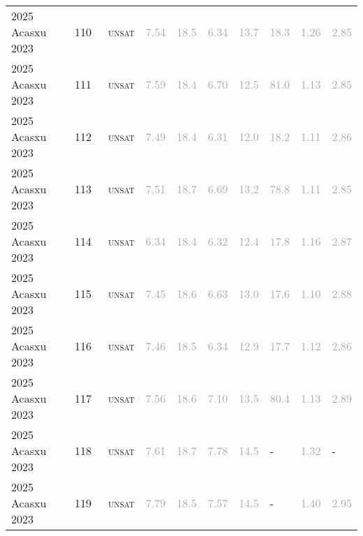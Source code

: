 \begin{center}
{\begin{longtable}{@{}llllllllll@{}}
2025 Acasxu 2023 & 110 & ~\textsc{unsat} & \textcolor{darkgray}{7.54} & \textcolor{darkgray}{18.5} & \textcolor{darkgray}{6.34} & \textcolor{darkgray}{13.7} & \textcolor{darkgray}{18.3} & \textcolor{darkgray}{1.26} & \textcolor{darkgray}{2.85} \\
2025 Acasxu 2023 & 111 & ~\textsc{unsat} & \textcolor{darkgray}{7.59} & \textcolor{darkgray}{18.4} & \textcolor{darkgray}{6.70} & \textcolor{darkgray}{12.5} & \textcolor{darkgray}{81.0} & \textcolor{darkgray}{1.13} & \textcolor{darkgray}{2.85} \\
2025 Acasxu 2023 & 112 & ~\textsc{unsat} & \textcolor{darkgray}{7.49} & \textcolor{darkgray}{18.4} & \textcolor{darkgray}{6.31} & \textcolor{darkgray}{12.0} & \textcolor{darkgray}{18.2} & \textcolor{darkgray}{1.11} & \textcolor{darkgray}{2.86} \\
2025 Acasxu 2023 & 113 & ~\textsc{unsat} & \textcolor{darkgray}{7.51} & \textcolor{darkgray}{18.7} & \textcolor{darkgray}{6.69} & \textcolor{darkgray}{13.2} & \textcolor{darkgray}{78.8} & \textcolor{darkgray}{1.11} & \textcolor{darkgray}{2.85} \\
2025 Acasxu 2023 & 114 & ~\textsc{unsat} & \textcolor{darkgray}{6.34} & \textcolor{darkgray}{18.4} & \textcolor{darkgray}{6.32} & \textcolor{darkgray}{12.4} & \textcolor{darkgray}{17.8} & \textcolor{darkgray}{1.16} & \textcolor{darkgray}{2.87} \\
2025 Acasxu 2023 & 115 & ~\textsc{unsat} & \textcolor{darkgray}{7.45} & \textcolor{darkgray}{18.6} & \textcolor{darkgray}{6.63} & \textcolor{darkgray}{13.0} & \textcolor{darkgray}{17.6} & \textcolor{darkgray}{1.10} & \textcolor{darkgray}{2.88} \\
2025 Acasxu 2023 & 116 & ~\textsc{unsat} & \textcolor{darkgray}{7.46} & \textcolor{darkgray}{18.5} & \textcolor{darkgray}{6.34} & \textcolor{darkgray}{12.9} & \textcolor{darkgray}{17.7} & \textcolor{darkgray}{1.12} & \textcolor{darkgray}{2.86} \\
2025 Acasxu 2023 & 117 & ~\textsc{unsat} & \textcolor{darkgray}{7.56} & \textcolor{darkgray}{18.6} & \textcolor{darkgray}{7.10} & \textcolor{darkgray}{13.5} & \textcolor{darkgray}{80.4} & \textcolor{darkgray}{1.13} & \textcolor{darkgray}{2.89} \\
2025 Acasxu 2023 & 118 & ~\textsc{unsat} & \textcolor{darkgray}{7.61} & \textcolor{darkgray}{18.7} & \textcolor{darkgray}{7.78} & \textcolor{darkgray}{14.5} & - & \textcolor{darkgray}{1.32} & - \\
2025 Acasxu 2023 & 119 & ~\textsc{unsat} & \textcolor{darkgray}{7.79} & \textcolor{darkgray}{18.5} & \textcolor{darkgray}{7.57} & \textcolor{darkgray}{14.5} & - & \textcolor{darkgray}{1.40} & \textcolor{darkgray}{2.95} \\

\end{longtable}}
\end{center}
